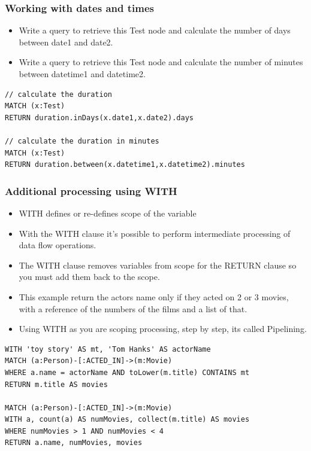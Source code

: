 \begin{frame}[fragile]\frametitle{Working with dates and times}

\begin{itemize}
\item Write a query to retrieve this Test node and calculate the number of days between date1 and date2.
\item Write a query to retrieve this Test node and calculate the number of minutes between datetime1 and datetime2.
\end{itemize}

\begin{lstlisting}
// calculate the duration
MATCH (x:Test)
RETURN duration.inDays(x.date1,x.date2).days

// calculate the duration in minutes
MATCH (x:Test)
RETURN duration.between(x.datetime1,x.datetime2).minutes
\end{lstlisting}


\end{frame}


\begin{frame}[fragile]\frametitle{Additional processing using WITH}

\begin{itemize}
\item WITH defines or re-defines scope of the variable
\item With the WITH clause it's possible to perform intermediate processing of data flow operations.
\item The WITH clause removes variables from scope for the RETURN clause so you must add them back to the scope.
\item This example return the actors name only if they acted on 2 or 3 movies, with a reference of the numbers of the films and a list of that.
\item Using WITH as you are scoping processing, step by step, its called Pipelining.
\end{itemize}

\begin{lstlisting}
WITH 'toy story' AS mt, 'Tom Hanks' AS actorName
MATCH (a:Person)-[:ACTED_IN]->(m:Movie)
WHERE a.name = actorName AND toLower(m.title) CONTAINS mt
RETURN m.title AS movies

MATCH (a:Person)-[:ACTED_IN]->(m:Movie)
WITH a, count(a) AS numMovies, collect(m.title) AS movies
WHERE numMovies > 1 AND numMovies < 4
RETURN a.name, numMovies, movies
\end{lstlisting}

\end{frame}

